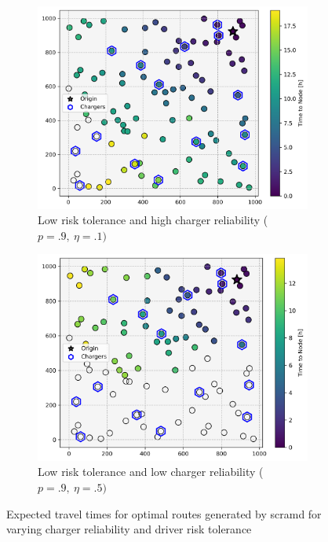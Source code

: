\begin{figure}[H]
\begin{subfigure}{.5\linewidth}
		\centering\includegraphics[width = \linewidth]{figs/parameter_factorial_10.png}
		\captionsetup{width=.8\linewidth}
		\caption{Low risk tolerance and high charger reliability ($p = .9,\ \eta = .1)$}
	\end{subfigure}%
	\begin{subfigure}{.5\linewidth}
		\centering\includegraphics[width = \linewidth]{figs/parameter_factorial_11.png}
		\captionsetup{width=.8\linewidth}
		\caption{Low risk tolerance and low charger reliability ($p = .9,\ \eta = .5)$}
	\end{subfigure}
	\caption{Expected travel times for optimal routes generated by \gls{scramd} for varying charger reliability and driver risk tolerance}
	\label{fig:parameter_factorial}
\end{figure}

